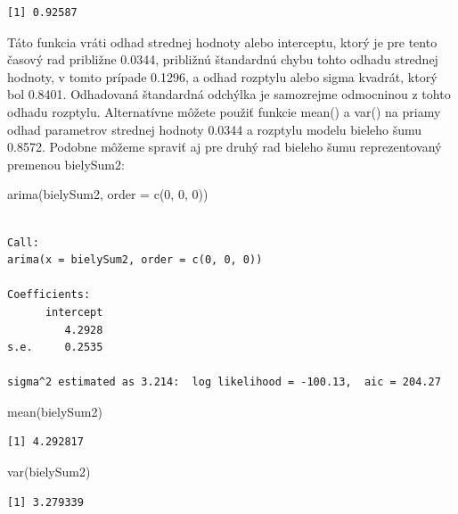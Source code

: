 \documentclass[
  letterpaper,
  DIV=11,
  numbers=noendperiod]{scrreprt}
\newenvironment{Shaded}{\begin{snugshade}}{\end{snugshade}}
\newcommand{\AttributeTok}[1]{\textcolor[rgb]{0.40,0.45,0.13}{#1}}
\newcommand{\DecValTok}[1]{\textcolor[rgb]{0.68,0.00,0.00}{#1}}
\newcommand{\FunctionTok}[1]{\textcolor[rgb]{0.28,0.35,0.67}{#1}}
\newcommand{\NormalTok}[1]{\textcolor[rgb]{0.00,0.23,0.31}{#1}}
\begin{document}
\begin{verbatim}
[1] 0.92587
\end{verbatim}

Táto funkcia vráti odhad strednej hodnoty alebo interceptu, ktorý je pre
tento časový rad približne 0.0344, približnú štandardnú chybu tohto
odhadu strednej hodnoty, v tomto prípade 0.1296, a odhad rozptylu alebo
sigma kvadrát, ktorý bol 0.8401. Odhadovaná štandardná odchýlka je
samozrejme odmocninou z tohto odhadu rozptylu. Alternatívne môžete
použiť funkcie mean() a var() na priamy odhad parametrov strednej
hodnoty 0.0344 a rozptylu modelu bieleho šumu 0.8572. Podobne môžeme
spraviť aj pre druhý rad bieleho šumu reprezentovaný premenou bielySum2:

\begin{Shaded}
\begin{Highlighting}[]
\FunctionTok{arima}\NormalTok{(bielySum2, }\AttributeTok{order =} \FunctionTok{c}\NormalTok{(}\DecValTok{0}\NormalTok{, }\DecValTok{0}\NormalTok{, }\DecValTok{0}\NormalTok{))}
\end{Highlighting}
\end{Shaded}

\begin{verbatim}

Call:
arima(x = bielySum2, order = c(0, 0, 0))

Coefficients:
      intercept
         4.2928
s.e.     0.2535

sigma^2 estimated as 3.214:  log likelihood = -100.13,  aic = 204.27
\end{verbatim}

\begin{Shaded}
\begin{Highlighting}[]
\FunctionTok{mean}\NormalTok{(bielySum2)}
\end{Highlighting}
\end{Shaded}

\begin{verbatim}
[1] 4.292817
\end{verbatim}

\begin{Shaded}
\begin{Highlighting}[]
\FunctionTok{var}\NormalTok{(bielySum2)}
\end{Highlighting}
\end{Shaded}

\begin{verbatim}
[1] 3.279339
\end{verbatim}
\end{document}

